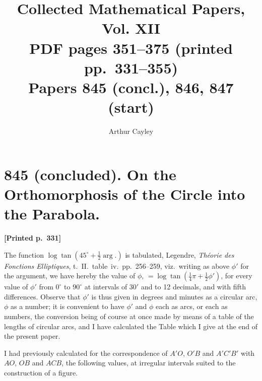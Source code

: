 \documentclass[11pt]{article}
\title{Collected Mathematical Papers, Vol. XII\\ \large PDF pages 351--375 (printed pp.\ 331--355)\\ Papers 845 (concl.), 846, 847 (start)}
\author{Arthur Cayley}
\date{}
\begin{document}
\maketitle


\section*{845 (concluded). On the Orthomorphosis of the Circle into the Parabola.}

\medskip

\noindent\textbf{[Printed p.~331]}\hfill

The function $\log\tan(45^{\circ}+\tfrac{1}{2}\arg.)$ is tabulated, Legendre, \textit{Th\'eorie des Fonctions Elliptiques}, t.~II.\ table~iv.\ pp.~256--259, viz.\ writing as above $\phi'$ for the argument, we have hereby the value of $\phi$, $=\log\tan(\tfrac{1}{4}\pi+\tfrac{1}{2}\phi')$, for every value of $\phi'$ from $0^{\circ}$ to $90^{\circ}$ at intervals of $30'$ and to 12 decimals, and with fifth differences. Observe that $\phi'$ is thus given in degrees and minutes as a circular arc, $\phi$ as a number; it is convenient to have $\phi'$ and $\phi$ each as arcs, or each as numbers, the conversion being of course at once made by means of a table of the lengths of circular arcs, and I have calculated the Table which I give at the end of the present paper.

I had previously calculated for the correspondence of $A'O$, $O'B$ and $A'C'B'$ with $AO$, $OB$ and $ACB$, the following values, at irregular intervals suited to the construction of a figure.

\medskip
\end{document}
